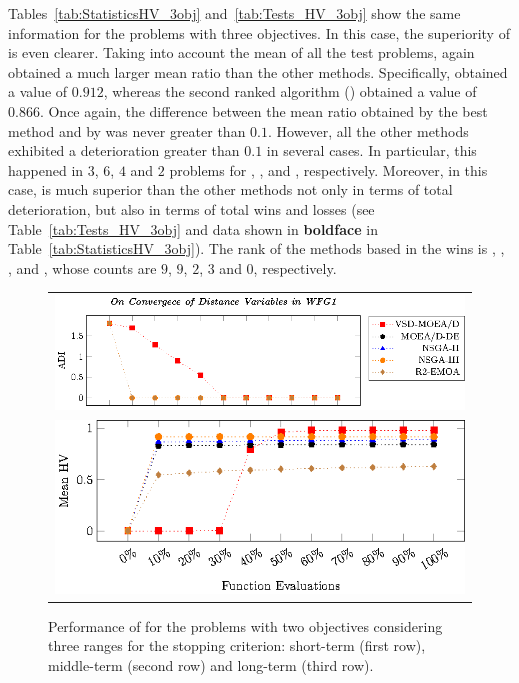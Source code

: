 Tables~\ref{tab:StatisticsHV_3obj} and~\ref{tab:Tests_HV_3obj} show the same information for the problems with three objectives.
%
In this case, the superiority of \VSDMOEAD{} is even clearer.
%
Taking into account the mean of all the test problems, \VSDMOEAD{} again obtained a much larger mean \HV{} ratio than the other methods.
%
Specifically, \VSDMOEAD{} obtained a value of $0.912$, whereas the second ranked algorithm (\RMOEA{}) obtained a value of $0.866$.
%
Once again, the difference between the mean \HV{} ratio obtained by the best method and by \VSDMOEAD{} was never greater than $0.1$.
%
However, all the other methods exhibited a deterioration greater than $0.1$ in several cases.
%
In particular, this happened in $3$, $6$, $4$ and $2$ problems for \RMOEA{}, \NSGAII{}, \NSGAIII{} and \MOEADDE{}, respectively.
%
Moreover, in this case, \VSDMOEAD{} is much superior than the other methods not only in terms of total deterioration, but also in terms of total wins and losses (see Table~\ref{tab:Tests_HV_3obj} and data shown in {\bf boldface} in Table~\ref{tab:StatisticsHV_3obj}).
%
The rank of the methods based in the wins is \VSDMOEAD{}, \RMOEA{}, \NSGAIII{}, \MOEADDE{} and \NSGAII{}, whose counts are $9$, $9$, $2$, $3$ and $0$, respectively.











\begin{figure}[t]
\centering
\begin{tabular}{l}
 \includegraphics[scale=0.8]{images/Diversity_Long_Term_tikz_WFG1-figure0.eps}\\[0cm]%
 \includegraphics[scale=0.8]{images/Diversity_Long_Term_tikz_WFG1-figure1.eps}\\[0cm]%
\end{tabular}
\caption{Performance of \MOEAS{} for the problems with two objectives considering three ranges for the stopping criterion: 
short-term (first row), middle-term (second row) and long-term (third row).}\label{fig:Performance_time_2obj}
\end{figure}


